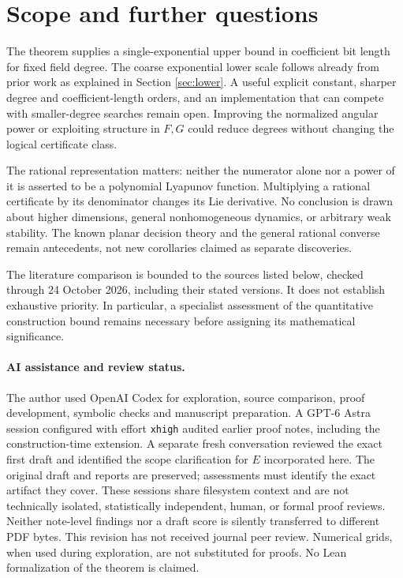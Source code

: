 \documentclass[11pt]{article}
\theoremstyle{remark}\newtheorem{remark}[theorem]{Remark}
\begin{document}
\section{Scope and further questions}

The theorem supplies a single-exponential upper bound in coefficient bit length for fixed field degree. The coarse exponential lower scale follows already from prior work as explained in Section \ref{sec:lower}. A useful explicit constant, sharper degree and coefficient-length orders, and an implementation that can compete with smaller-degree searches remain open. Improving the normalized angular power or exploiting structure in \(F,G\) could reduce degrees without changing the logical certificate class.

The rational representation matters: neither the numerator alone nor a power of it is asserted to be a polynomial Lyapunov function. Multiplying a rational certificate by its denominator changes its Lie derivative. No conclusion is drawn about higher dimensions, general nonhomogeneous dynamics, or arbitrary weak stability. The known planar decision theory and the general rational converse remain antecedents, not new corollaries claimed as separate discoveries.

The literature comparison is bounded to the sources listed below, checked through 24 October 2026, including their stated versions. It does not establish exhaustive priority. In particular, a specialist assessment of the quantitative construction bound remains necessary before assigning its mathematical significance.

\paragraph{AI assistance and review status.}
The author used OpenAI Codex for exploration, source comparison, proof development, symbolic checks and manuscript preparation. A GPT-6 Astra session configured with effort \texttt{xhigh} audited earlier proof notes, including the construction-time extension. A separate fresh conversation reviewed the exact first draft and identified the scope clarification for \(E\) incorporated here. The original draft and reports are preserved; assessments must identify the exact artifact they cover. These sessions share filesystem context and are not technically isolated, statistically independent, human, or formal proof reviews. Neither note-level findings nor a draft score is silently transferred to different PDF bytes. This revision has not received journal peer review. Numerical grids, when used during exploration, are not substituted for proofs. No Lean formalization of the theorem is claimed.
\end{document}
